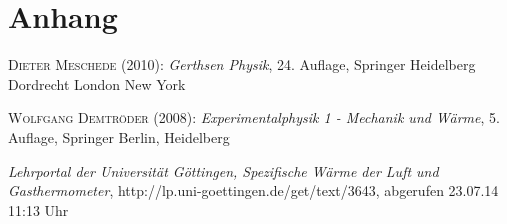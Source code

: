 \documentclass[12pt,a4paper,titlepage,headinclude,bibtotoc]{scrartcl}
\begin{document}
\section{Anhang}

\begin{thebibliography}{100}

	\textsc{Dieter Meschede} (2010): \emph{Gerthsen Physik}, 24. Auflage, Springer Heidelberg
Dordrecht London New York

\textsc{Wolfgang Demtröder} (2008): \emph{Experimentalphysik 1 - Mechanik und Wärme}, 5. Auflage, Springer Berlin, Heidelberg

	\emph{Lehrportal der Universität Göttingen, Spezifische Wärme der Luft und Gasthermometer},
  http://lp.uni-goettingen.de/get/text/3643, abgerufen 23.07.14 11:13 Uhr

\end{thebibliography}
\end{document}
